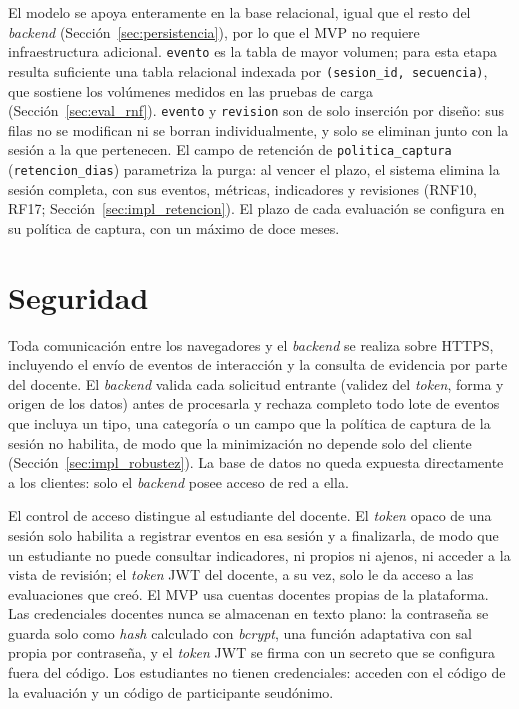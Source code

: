 El modelo se apoya enteramente en la base relacional, igual que el resto del \textit{backend} (Sección~\ref{sec:persistencia}), por lo que el MVP no requiere infraestructura adicional. \texttt{evento} es la tabla de mayor volumen; para esta etapa resulta suficiente una tabla relacional indexada por \texttt{(sesion\_id, secuencia)}, que sostiene los volúmenes medidos en las pruebas de carga (Sección~\ref{sec:eval_rnf}). \texttt{evento} y \texttt{revision} son de solo inserción por diseño: sus filas no se modifican ni se borran individualmente, y solo se eliminan junto con la sesión a la que pertenecen. El campo de retención de \texttt{politica\_captura} (\texttt{retencion\_dias}) parametriza la purga: al vencer el plazo, el sistema elimina la sesión completa, con sus eventos, métricas, indicadores y revisiones (RNF10, RF17; Sección~\ref{sec:impl_retencion}). El plazo de cada evaluación se configura en su política de captura, con un máximo de doce meses.

\section{Seguridad}

Toda comunicación entre los navegadores y el \textit{backend} se realiza sobre HTTPS, incluyendo el envío de eventos de interacción y la consulta de evidencia por parte del docente. El \textit{backend} valida cada solicitud entrante (validez del \textit{token}, forma y origen de los datos) antes de procesarla y rechaza completo todo lote de eventos que incluya un tipo, una categoría o un campo que la política de captura de la sesión no habilita, de modo que la minimización no depende solo del cliente (Sección~\ref{sec:impl_robustez}). La base de datos no queda expuesta directamente a los clientes: solo el \textit{backend} posee acceso de red a ella.

El control de acceso distingue al estudiante del docente. El \textit{token} opaco de una sesión solo habilita a registrar eventos en esa sesión y a finalizarla, de modo que un estudiante no puede consultar indicadores, ni propios ni ajenos, ni acceder a la vista de revisión; el \textit{token} JWT del docente, a su vez, solo le da acceso a las evaluaciones que creó. El MVP usa cuentas docentes propias de la plataforma. Las credenciales docentes nunca se almacenan en texto plano: la contraseña se guarda solo como \textit{hash} calculado con \textit{bcrypt}, una función adaptativa con sal propia por contraseña, y el \textit{token} JWT se firma con un secreto que se configura fuera del código. Los estudiantes no tienen credenciales: acceden con el código de la evaluación y un código de participante seudónimo.

